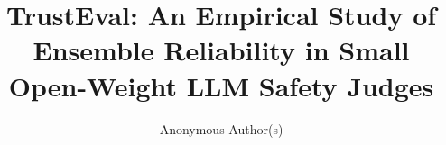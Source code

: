 \documentclass[sigconf,review,anonymous]{acmart}
\begin{document}
\title{TrustEval: An Empirical Study of Ensemble Reliability in Small Open-Weight LLM Safety Judges}

\author{Anonymous Author(s)}
\email{}



\maketitle








\balance




\end{document}
